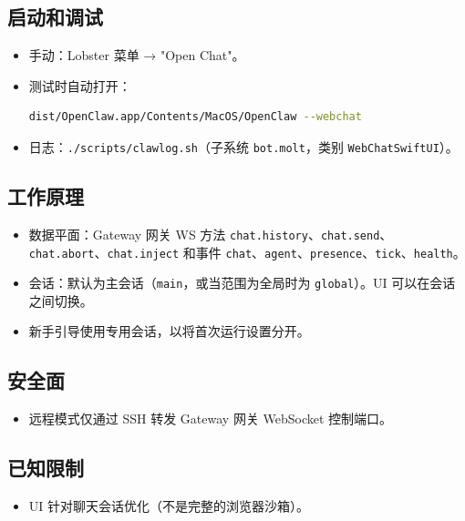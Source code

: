 \subsection{启动和调试}


\begin{itemize}
  \item 手动：Lobster 菜单 → "Open Chat"。
  \item 测试时自动打开：
\begin{lstlisting}[language=bash]
  dist/OpenClaw.app/Contents/MacOS/OpenClaw --webchat
\end{lstlisting}

  \item 日志：\texttt{./scripts/clawlog.sh}（子系统 \texttt{bot.molt}，类别 \texttt{WebChatSwiftUI}）。
\end{itemize}


\subsection{工作原理}


\begin{itemize}
  \item 数据平面：Gateway 网关 WS 方法 \texttt{chat.history}、\texttt{chat.send}、\texttt{chat.abort}、\texttt{chat.inject} 和事件 \texttt{chat}、\texttt{agent}、\texttt{presence}、\texttt{tick}、\texttt{health}。
  \item 会话：默认为主会话（\texttt{main}，或当范围为全局时为 \texttt{global}）。UI 可以在会话之间切换。
  \item 新手引导使用专用会话，以将首次运行设置分开。
\end{itemize}


\subsection{安全面}


\begin{itemize}
  \item 远程模式仅通过 SSH 转发 Gateway 网关 WebSocket 控制端口。
\end{itemize}


\subsection{已知限制}


\begin{itemize}
  \item UI 针对聊天会话优化（不是完整的浏览器沙箱）。
\end{itemize}



